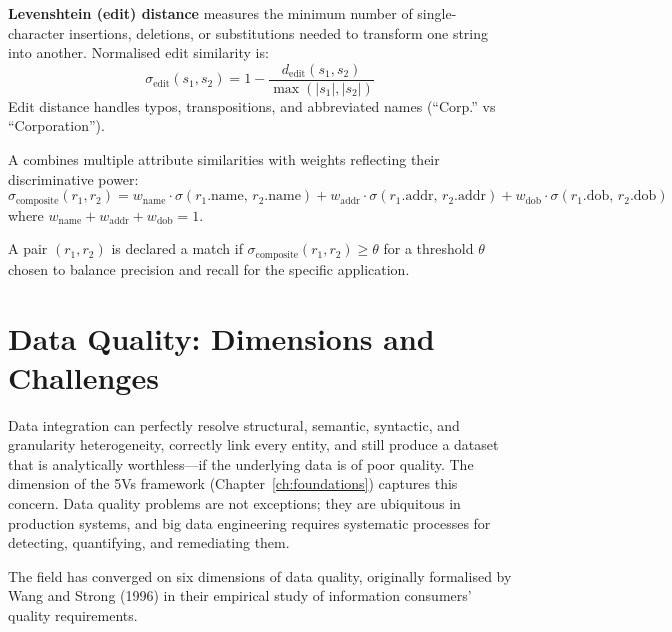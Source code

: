 \textbf{Levenshtein (edit) distance} measures the minimum number of
single-character insertions, deletions, or substitutions needed to
transform one string into another. Normalised edit similarity is:
\begin{equation}
\sigma_\text{edit}(s_1, s_2) = 1 -
  \frac{d_\text{edit}(s_1, s_2)}{\max(|s_1|, |s_2|)}
\label{eq:edit-sim}
\end{equation}
Edit distance handles typos, transpositions, and abbreviated names
(``Corp.'' vs ``Corporation'').

A  combines multiple attribute
similarities with weights reflecting their discriminative power:
\begin{equation}
\sigma_\text{composite}(r_1, r_2) =
  w_\text{name} \cdot \sigma(r_1.\text{name},\, r_2.\text{name})
  + w_\text{addr} \cdot \sigma(r_1.\text{addr},\, r_2.\text{addr})
  + w_\text{dob}  \cdot \sigma(r_1.\text{dob},\, r_2.\text{dob})
\label{eq:composite-sim}
\end{equation}
where $w_\text{name} + w_\text{addr} + w_\text{dob} = 1$.

A pair $(r_1, r_2)$ is declared a match if
$\sigma_\text{composite}(r_1, r_2) \geq \theta$ for a threshold $\theta$
chosen to balance precision and recall for the specific application.

\section{Data Quality: Dimensions and Challenges}
\label{sec:data-quality}

Data integration can perfectly resolve structural, semantic, syntactic,
and granularity heterogeneity, correctly link every entity, and still
produce a dataset that is analytically worthless---if the underlying
data is of poor quality. The  dimension of the 5Vs
framework (Chapter~\ref{ch:foundations}) captures this concern. Data
quality problems are not exceptions; they are ubiquitous in production
systems, and big data engineering requires systematic processes for
detecting, quantifying, and remediating them.

The field has converged on six dimensions of data quality, originally
formalised by Wang and Strong (1996) in their empirical study of
information consumers' quality requirements.

